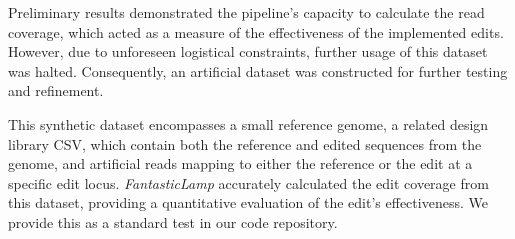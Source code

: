 \documentclass{bioinfo}
\theoremstyle{definition}
\begin{document}
Preliminary results demonstrated the pipeline's capacity to calculate the read coverage, which acted as a measure of the effectiveness of the implemented edits.
However, due to unforeseen logistical constraints, further usage of this dataset was halted.
Consequently, an artificial dataset was constructed for further testing and refinement.

This synthetic dataset encompasses a small reference genome, a related design library CSV, which contain both the reference and edited sequences from the genome, and artificial reads mapping to either the reference or the edit at a specific edit locus. 
\textit{FantasticLamp} accurately calculated the edit coverage from this dataset, providing a quantitative evaluation of the edit's effectiveness.
We provide this as a standard test in our code repository.


%
\end{document}
